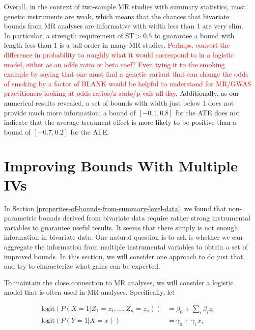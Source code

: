 \documentclass[
]{article}
\theoremstyle{plain}
\begin{document}
{\begin{table}[H]
\begin{center}
  \end{center}
\end{table}

Overall, in the context of two-sample MR studies with summary statistics, most genetic instruments are weak, which means that the chances that bivariate bounds from MR analyses are informative with width less than 1 are very slim. In particular, a strength requirement of $\text{ST} > 0.5$ to guarantee a bound with length less than $1$ is a tall order in many MR studies. \textcolor{red}{Perhaps, convert the difference in probability to roughly what it would correspond to in a logistic model, either as an odds ratio or beta coef? Even tying it to the smoking example by saying that one must find a genetic variant that can change the odds of smoking by a factor of BLANK would be helpful to understand for MR/GWAS practitioners looking at odds ratios/z-stats/p-vals all day.} Additionally, as our numerical results revealed, a set of bounds with width just below 1 does not provide much more information; a bound of \([-0.1, 0.8]\) for the ATE does not indicate that the average treatment effect is more likely to be positive than a bound of \([-0.7, 0.2]\) for the ATE.

\hypertarget{improving-bounds-with-multiple-ivs}{%
\section{Improving Bounds With Multiple IVs}\label{improving-bounds-with-multiple-ivs}}

In Section \ref{properties-of-bounds-from-summary-level-data}, we found that non-parametric bounds derived from bivariate data require rather strong instrumental variables to guarantee useful results. It seems that there simply is not enough information in bivariate data. One natural question is to ask is whether we can aggregate the information from multiple instrumental variables to obtain a set of improved bounds. In this section, we will consider one approach to do just that, and try to characterize what gains can be expected.

To maintain the close connection to MR analyses, we will consider a logistic model that is often used in MR analyses. Specifically, let

\[\begin{aligned}
\text{logit}(P(X = 1 | Z_1 = z_1, ..., Z_n = z_n)) &= \beta_0 + \sum_i \beta_i z_i \\
\text{logit}(P(Y = 1 | X = x)) &= \gamma_0 + \gamma_1 x,
\end{aligned}\]

}
\end{document}
